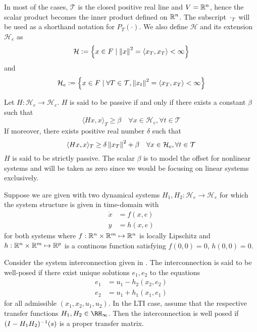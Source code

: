 In most of the cases, $\mathcal{T}$ is the closed positive real line and $V=\mathbb{R}^n$, hence the scalar product becomes the inner product 
defined on $\mathbb{R}^n$. The subscript ${\cdot}_T$ will be used as a shorthand notation for $P_T(\cdot)$. We also define $\mathcal{H}$ 
and its extension $\mathcal{H}_e$ as 
\[
\mathcal{H} := \left\{ x\in F\mid \displaystyle \left\| x \right\|^2=\langle x_T,x_T \rangle<\infty \right\}
\]
and
\[
\mathcal{H}_e := \left\{ x\in F\mid \forall T\in\mathcal{T}, \displaystyle \left\| x_t \right\|^2=\langle x_T,x_T \rangle<\infty \right\}
\]



\begin{define}Let $H:\mathcal{H}_e\to\mathcal{H}_e$. $H$ is said to be passive if and only if there exists a constant 
$\beta$ such that
\[
\langle Hx,x \rangle_T \geq \beta\quad \forall x\in\mathcal{H}_e,\forall t\in\mathcal{T}
\]
If moreover, there exists positive real number $\delta$ such that
\[
\langle Hx,x \rangle_T \geq \delta\displaystyle \left\| x_T \right\|^2+ \beta\quad \forall x\in\mathcal{H}_e,\forall t\in\mathcal{T}
\]
$H$ is said to be strictly passive. The scalar $\beta$ is to model the offset for nonlinear systems and 
will be taken as zero since we would be focusing on linear systems exclusively. 
\end{define}
Suppose we are given with two dynamical systems $H_1,H_2: \mathcal{H}_e\to\mathcal{H}_e$ for which the system structure is given in time-domain with 
\begin{align}
\dot{x} &= f(x,e)\\
y &= h(x,e)
\end{align}
for both systems where $f: \mathbb{R}^n\times\mathbb{R}^m\mapsto \mathbb{R}^n$ is locally Lipschitz and $h: \mathbb{R}^n\times\mathbb{R}^m\mapsto \mathbb{R}^p$
is a continous function satisfying $f(0,0)=0$, $h(0,0)=0$. 

\begin{define} Consider the system interconnection given in . The interconnection is said to 
be well-posed if there exist unique solutions $e_1,e_2$ to the equations
\begin{align}\label{eq:apdx:passint1}
e_1 &= u_1-h_2(x_2,e_2)\\\label{eq:apdx:passint2}
e_2 &= u_1+h_1(x_1,e_1)
\end{align}
for all admissible $(x_1,x_2,u_1,u_2)$. In the LTI case, assume that the respective transfer functions $H_1,H_2\in\RH_\infty$. Then
the interconnection is well posed if $(I-H_1H_2)^{-1}(s)$ is a proper transfer matrix.
\end{define}

